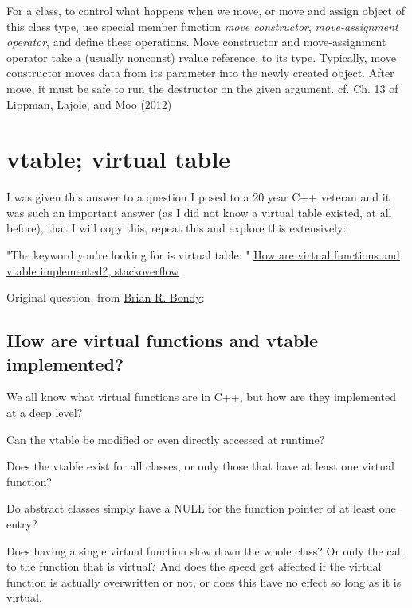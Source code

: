 \documentclass[10pt]{amsart}
\begin{document}
For a class, to control what happens when we move, or move and assign object of this class type, use special member function \emph{move constructor}, \emph{move-assignment operator}, and define these operations.  Move constructor and move-assignment operator take a (usually nonconst) rvalue reference, to its type.  Typically, move constructor moves data from its parameter into the newly created object.  After move, it must be safe to run the destructor on the given argument.  cf. Ch. 13 of Lippman, Lajole, and Moo (2012) \cite{LLM2012}



\section{vtable; virtual table}  

I was given this answer to a question I posed to a 20 year C++ veteran and it was such an important answer (as I did not know a virtual table existed, at all before), that I will copy this, repeat this and explore this extensively:  

"The keyword you're looking for is virtual table: " \href{https://stackoverflow.com/questions/99297/how-are-virtual-functions-and-vtable-implemented}{How are virtual functions and vtable implemented?, stackoverflow}  

Original question, from \href{https://stackoverflow.com/users/3153/brian-r-bondy}{Brian R. Bondy}:  

\subsection{How are virtual functions and vtable implemented?}

We all know what virtual functions are in C++, but how are they implemented at a deep level?

Can the vtable be modified or even directly accessed at runtime?

Does the vtable exist for all classes, or only those that have at least one virtual function?

Do abstract classes simply have a NULL for the function pointer of at least one entry?

Does having a single virtual function slow down the whole class? Or only the call to the function that is virtual? And does the speed get affected if the virtual function is actually overwritten or not, or does this have no effect so long as it is virtual.
\end{document}
